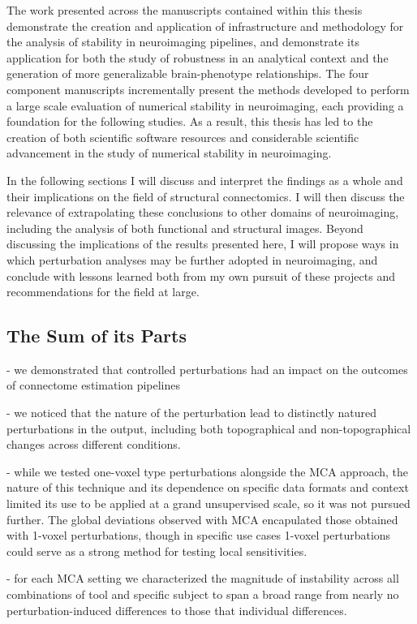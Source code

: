 The work presented across the manuscripts contained within this thesis demonstrate the creation and application of
infrastructure and methodology for the analysis of stability in neuroimaging pipelines, and demonstrate its
application for both the study of robustness in an analytical context and the generation of more generalizable
brain-phenotype relationships. The four component manuscripts incrementally present the methods developed to
perform a large scale evaluation of numerical stability in neuroimaging, each providing a foundation for the
following studies. As a result, this thesis has led to the creation of both scientific software resources and
considerable scientific advancement in the study of numerical stability in neuroimaging.

In the following sections I will discuss and interpret the findings as a whole and their implications on the field
of structural connectomics. I will then discuss the relevance of extrapolating these conclusions to other domains
of neuroimaging, including the analysis of both functional and structural images. Beyond discussing the
implications of the results presented here, I will propose ways in which perturbation analyses may be further
adopted in neuroimaging, and conclude with lessons learned both from my own pursuit of these projects and
recommendations for the field at large.

\subsection{The Sum of its Parts}

- we demonstrated that controlled perturbations had an impact on the outcomes of connectome estimation pipelines

- we noticed that the nature of the perturbation lead to distinctly natured perturbations in the output, including
both topographical and non-topographical changes across different conditions.

- while we tested one-voxel type perturbations alongside the MCA approach, the nature of this technique and its
dependence on specific data formats and context limited its use to be applied at a grand unsupervised scale, so it
was not pursued further. The global deviations observed with MCA encapulated those obtained with 1-voxel
perturbations, though in specific use cases 1-voxel perturbations could serve as a strong method for testing local
sensitivities.

- for each MCA setting we characterized the magnitude of instability across all combinations of
tool and specific subject to span a broad range from nearly no perturbation-induced differences to those that
individual differences.

